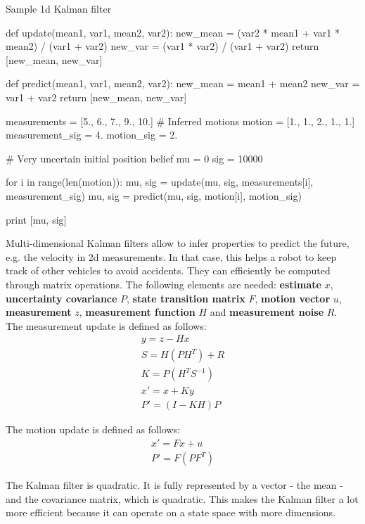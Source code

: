 \documentclass{report}
\begin{document}
\begin{algorithm}
\caption{Sample 1d Kalman filter}
\label{ref:1dkalmanfilterpython}
\begin{python}
def update(mean1, var1, mean2, var2):
    new_mean = (var2 * mean1 + var1 * mean2) / (var1 + var2)
    new_var = (var1 * var2) / (var1 + var2)
    return [new_mean, new_var]

def predict(mean1, var1, mean2, var2):
    new_mean = mean1 + mean2
    new_var = var1 + var2
    return [new_mean, new_var]

measurements = [5., 6., 7., 9., 10.]
# Inferred motions
motion = [1., 1., 2., 1., 1.]
measurement_sig = 4.
motion_sig = 2.

# Very uncertain initial position belief
mu = 0
sig = 10000

for i in range(len(motion)):
    mu, sig = update(mu, sig, measurements[i], measurement_sig)
    mu, sig = predict(mu, sig, motion[i], motion_sig)

print [mu, sig]

\end{python}
\end{algorithm}


Multi-dimensional Kalman filters allow to infer properties to predict the future, e.g. the velocity in 2d measurements. In that case, this helps a robot to keep track of other vehicles to avoid accidents. They can efficiently be computed through matrix operations. The following elements are needed: {\bf estimate} $x$, {\bf uncertainty covariance} $P$, {\bf state transition matrix} $F$, {\bf motion vector} $u$, {\bf measurement} $z$, {\bf measurement function} $H$ and {\bf measurement noise} $R$. \\

The measurement update is defined as follows:
\begin{align*}
y = z - Hx \\
S = H(PH^T) + R \\
K = P(H^T S^{-1}) \\
x\prime = x + Ky \\
P\prime = (I - KH)P
\end{align*}


The motion update is defined as follows:
\begin{align*}
x\prime = Fx + u \\
P\prime = F(PF^T)
\end{align*}

The Kalman filter is quadratic. It is fully represented by a vector - the mean - and the covariance matrix, which is quadratic. This makes the Kalman filter a lot more efficient because it can operate on a state space with more dimensions. \\
\end{document}
